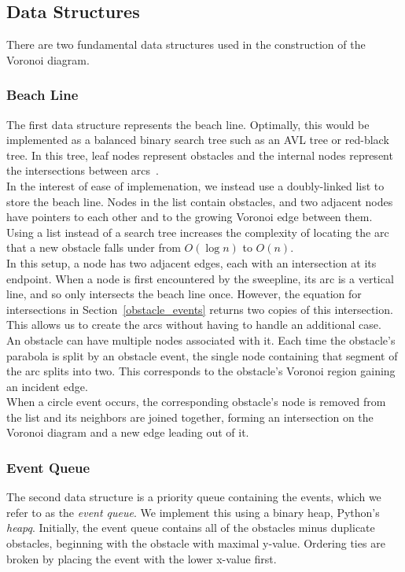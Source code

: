 \documentclass[conference]{IEEEtran}
\begin{document}
\subsection{Data Structures}
There are two fundamental data structures used in the construction of the Voronoi
diagram.

\subsubsection{Beach Line}
The first data structure represents the beach line. Optimally,
this would be implemented as a balanced binary search tree such as an AVL tree or
red-black tree. In this tree, leaf nodes represent obstacles and
the internal nodes represent the intersections between arcs~\cite{mitslides}.\\
\indent In the interest of ease of implemenation, we instead use a doubly-linked list to
store the beach line. Nodes in the list contain obstacles, and two adjacent nodes have
pointers to each other and to the growing Voronoi edge between them. Using a list
instead of a search tree increases the complexity of locating the arc that a
new obstacle falls under from $O(\log n)$ to $O(n)$.\\
\indent In this setup, a node has two adjacent edges, each with an intersection
at its endpoint. When a node is first encountered by the sweepline, its arc is a
vertical line, and so only intersects the beach line once. However, the equation
for intersections in Section~\ref{obstacle_events} returns two copies of this
intersection. This allows us to create the arcs without having to handle an
additional case.\\
\indent An obstacle can have multiple nodes associated with it. Each time the
obstacle's parabola is split by an obstacle event, the single node containing
that segment of the arc splits into two. This corresponds to the obstacle's
Voronoi region gaining an incident edge.\\
\indent When a circle event occurs, the corresponding obstacle's node is removed
from the list and its neighbors are joined together, forming an intersection on the
Voronoi diagram and a new edge leading out of it.

\subsubsection{Event Queue}
The second data structure is a priority queue containing the events, which we refer to as
the \emph{event queue}. We implement this using a binary heap, Python's \emph{heapq}.
Initially, the event queue contains all of the obstacles minus duplicate obstacles,
beginning with the obstacle with maximal y-value. Ordering ties are broken by
placing the event with the lower x-value first.
\end{document}
